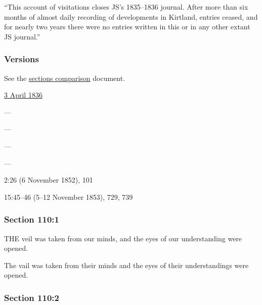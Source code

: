 			``This account of visitations closes JS's 1835--1836 journal. After more than six months of almost daily recording of developments in Kirtland, entries ceased, and for nearly two years there were no entries written in this or in any other extant JS journal.''
					
	\subsubsection{Versions}
		\label{DC110-V}
		
		See the \href{https://drive.google.com/file/d/1goAvNz8jS4R8slYfMG_db55Ty2z_vmgK/view?usp=sharing}{sections comparison} document.
	
		\begin{compactdesc}
			\item[JSP] \hyperref[EMS-1836-JS-3-APR-1836]{3 April 1836}
			\item[BC] ---
			\item[DC 1835] ---
			\item[DC 1844] ---
			\item[TS] ---
			\item[DN] 2:26 (6 November 1852), 101
			\item[MS] 15:45--46 (5--12 November 1853), 729, 739
		\end{compactdesc}

	\subsubsection{Section 110:1} %
		\label{DC110-1}

		THE veil was taken from our minds, and the eyes of our understanding were opened.

		\begin{framed}
		\scriptsize
			\begin{compactdesc}
				\item[JSP] The vail was taken from their minds and the eyes of their understandings were opened.
			\end{compactdesc}
		\end{framed}

	\subsubsection{Section 110:2} %
		\label{DC110-2}

